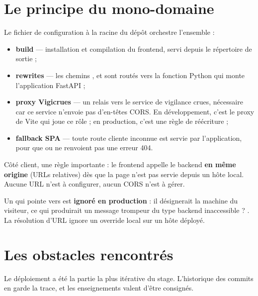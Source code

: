 \section{Le principe du mono-domaine}

Le fichier de configuration à la racine du dépôt orchestre l'ensemble :

\begin{itemize}[leftmargin=1.4em]
  \item \textbf{build} — installation et compilation du frontend, servi depuis
        le répertoire de sortie ;
  \item \textbf{rewrites} — les chemins ,  et
         sont routés vers la fonction Python qui monte
        l'application FastAPI ;
  \item \textbf{proxy Vigicrues} — un relais vers le service de vigilance
        crues, nécessaire car ce service n'envoie pas d'en-têtes CORS. En
        développement, c'est le proxy de Vite qui joue ce rôle ; en production,
        c'est une règle de réécriture ;
  \item \textbf{fallback SPA} — toute route cliente inconnue est servie par
        l'application, pour que  ou  ne renvoient
        pas une erreur 404.
\end{itemize}

Côté client, une règle importante : le frontend appelle le backend
\textbf{en même origine} (URLs relatives) dès que la page n'est pas servie
depuis un hôte local. Aucune URL n'est à configurer, aucun CORS n'est à gérer.

\begin{invariant}
Un  qui pointe vers  est
\textbf{ignoré en production} : il désignerait la machine du visiteur, ce qui
produirait un message trompeur du type \og backend inaccessible ? \fg. La
résolution d'URL ignore un override local sur un hôte déployé.
\end{invariant}

\section{Les obstacles rencontrés}

Le déploiement a été la partie la plus itérative du stage. L'historique des
commits en garde la trace, et les enseignements valent d'être consignés.

